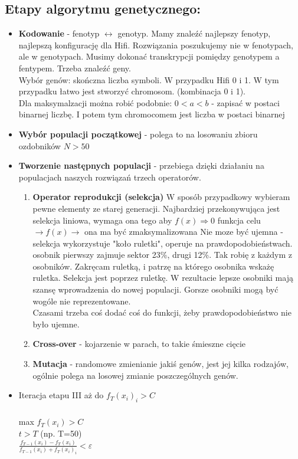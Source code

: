\documentclass{article}
\begin{document}
		\subsection{Etapy algorytmu genetycznego:}
		\begin{itemize}
			\item \textbf{Kodowanie} - fenotyp $\leftrightarrow$ genotyp. Mamy znaleźć najlepszy fenotyp, najlepszą konfigurację dla Hifi. Rozwiązania poszukujemy nie w fenotypach, ale w genotypach. Musimy dokonać transkrypcji pomiędzy genotypem a fentypem. Trzeba znaleźć geny. \\
			Wybór genów:  skończna liczba symboli. W przypadku Hifi 0 i 1. W tym przypadku łatwo jest stworzyć chromosom. (kombinacja 0 i 1). \\
			Dla maksymalzacji można robić podobnie: 
			$0 < a < b$ - zapisać w postaci binarnej liczbę. I potem tym chromocomem jest liczba w postaci binarnej
			
			\item \textbf{Wybór populacji początkowej} - polega to na losowaniu zbioru ozdobników $ N > 50$
			\item \textbf{Tworzenie następnych populacji} - przebiega dzięki działaniu na populacjach naszych rozwiązań trzech operatorów. \\
			\begin{enumerate}
				\item \textbf{Operator reprodukcji (selekcja)} W sposób przypadkowy wybieram pewne elementy ze starej generacji. Najbardziej przekonywująca jest selekcja liniowa, wymaga ona tego aby $f(x) \Rightarrow 0$
				funkcja celu $\rightarrow f(x) \rightarrow$ ona ma być zmaksymalizowana
				Nie moze być ujemna - selekcja wykorzystuje "koło ruletki", operuje na prawdopodobieństwach.
				osobnik pierwszy zajmuje sektor  23\%, drugi 12\%. Tak robię z każdym z osobników. 
				Zakręcam ruletką, i patrzę na którego osobnika wskażę ruletka. Selekcja jest poprzez ruletkę. 
				W rezultacie lepsze osobniki mają szansę wprowadzenia do nowej populacji. Gorsze osobniki mogą być wogóle nie reprezentowane. \\
				Czasami trzeba coś dodać coś do funkcji, żeby prawdopodobieństwo nie było ujemne.
				\item \textbf{Cross-over} - kojarzenie w parach, to takie śmieszne cięcie
				\item \textbf{Mutacja} - randomowe zmienianie jakiś genów, jest jej kilka rodzajów, ogólnie polega na losowej zmianie poszczególnych genów. 
			
			
			\end{enumerate}
			\item  Iteracja etapu III aż do $ f_T(x_i)_i > C $
			\subparagraph{}
				\centering	max $f_T(x_i) > C $ \\
				$t>T$ (np. T=50) \\
				$\frac{f_{T-1}(x_i) - f_T(x_i)}{f_{T-1}(x_i)+f_T(x_i)_i} < \varepsilon$ \\
		\end{itemize}
		
\end{document}

